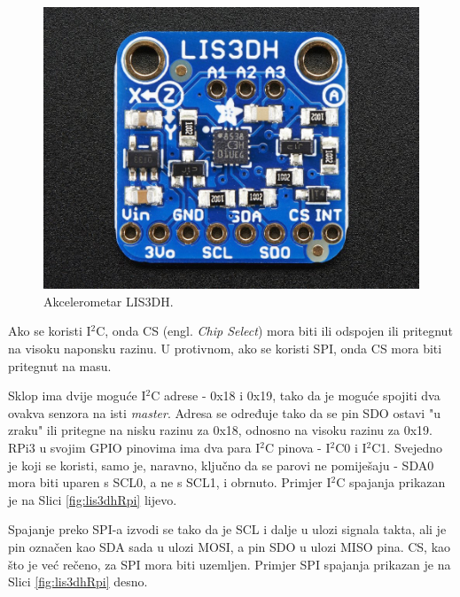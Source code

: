 \documentclass[12pt,a4paper]{article}
\begin{document}
		\begin{figure}[h!]
			\includegraphics[width=\linewidth]{slike/lis3dh.jpg}
			\caption{Akcelerometar LIS3DH.}
			\label{fig:lis3dh}
		\end{figure}

		\par Ako se koristi I$^2$C, onda CS (engl. \textit{Chip Select}) mora biti ili odspojen ili pritegnut na visoku naponsku razinu. U protivnom, ako se koristi SPI, onda CS mora biti pritegnut na masu.

		\par Sklop ima dvije moguće I$^2$C adrese - 0x18 i 0x19, tako da je moguće spojiti dva ovakva senzora na isti \textit{master}. Adresa se određuje tako da se pin SDO ostavi "u zraku" ili pritegne na nisku razinu za 0x18, odnosno na visoku razinu za 0x19. \\
		RPi3 u svojim GPIO pinovima ima dva para I$^2$C pinova - I$^2$C0 i I$^2$C1. Svejedno je koji se koristi, samo je, naravno, ključno da se parovi ne pomiješaju - SDA0 mora biti uparen s SCL0, a ne s SCL1, i obrnuto. Primjer I$^2$C spajanja prikazan je na Slici \ref{fig:lis3dhRpi} lijevo.

		\par Spajanje preko SPI-a izvodi se tako da je SCL i dalje u ulozi signala takta, ali je pin označen kao SDA sada u ulozi MOSI, a pin SDO u ulozi MISO pina. CS, kao što je već rečeno, za SPI mora biti uzemljen. Primjer SPI spajanja prikazan je na Slici \ref{fig:lis3dhRpi} desno.
\end{document}
